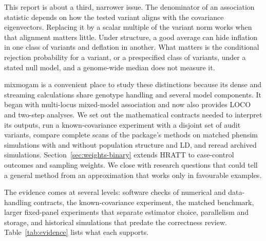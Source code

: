 \documentclass[11pt]{article}
\begin{document}
This report is about a third, narrower issue. The denominator of an
association statistic depends on how the tested variant aligns with the
covariance eigenvectors. Replacing it by a scalar multiple of the variant
norm works when that alignment matters little. Under structure, a good
average can hide inflation in one class of variants and deflation in
another. What matters is the conditional rejection probability for a
variant, or a prespecified class of variants, under a stated null model,
and a genome-wide median does not measure it.

mixmogam is a convenient place to study these distinctions because its
dense and streaming calculations share genotype handling and several
model components. It began with multi-locus mixed-model association
\citep{segura2012} and now also provides LOCO and two-step analyses.
We set out the mathematical contracts needed to interpret its outputs,
run a known-covariance experiment with a disjoint set of audit variants,
compare complete scans of the package's methods on matched phensim
simulations with and without population structure and LD, and reread
archived simulations. Section~\ref{sec:weights-binary} extends HRATT
to case-control outcomes and sampling weights. We close with research
questions that could tell a general method from an approximation that
works only in favourable examples.

The evidence comes at several levels: software checks of numerical and
data-handling contracts, the known-covariance experiment, the matched
benchmark, larger fixed-panel experiments that separate estimator choice,
parallelism and storage, and historical simulations that predate the
correctness review. Table~\ref{tab:evidence} lists what each supports.
\end{document}
